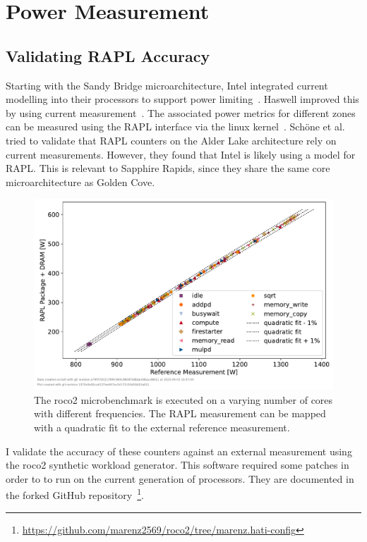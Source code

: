 \chapter{Power Measurement}
\label{sec:power_measurement}

\section{Validating RAPL Accuracy}
\label{sec:validating_rapl_accuracy}
Starting with the Sandy Bridge microarchitecture, Intel integrated current modelling into their processors to support power limiting~\cite{Hackenberg_2013_RAPL_APM}.
Haswell improved this by using current measurement~\cite{Hackenberg_2015_Haswell}.
The associated power metrics for different zones can be measured using the RAPL interface via the linux kernel~\cite{powercap_kernel_doc}.
Schöne et al.~\cite{Schoene_2024_Alder_Lake} tried to validate that RAPL counters on the Alder Lake architecture rely on current measurements.
However, they found that Intel is likely using a model for RAPL.
This is relevant to Sapphire Rapids, since they share the same core microarchitecture as Golden Cove.

\begin{figure}[]
    \centering
    \includegraphics[width=0.8\columnwidth]{fig/rapl-accuracy/rapl-accuracy.pdf}
    \caption{\label{fig:validate-rapl}The roco2 microbenchmark is executed on a varying number of cores with different frequencies.
    The RAPL measurement can be mapped with a quadratic fit to the external reference measurement.}
\end{figure}

I validate the accuracy of these counters against an external measurement using the roco2 synthetic workload generator.
This software required some patches in order to to run on the current generation of processors.
They are documented in the forked GitHub repository~\footnote{\url{https://github.com/marenz2569/roco2/tree/marenz.hati-config}}.


